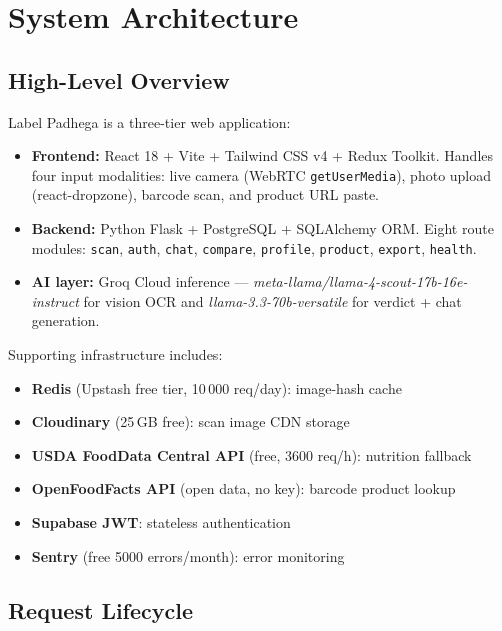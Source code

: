 \documentclass[conference]{IEEEtran}
\begin{document}
\section{System Architecture}

\subsection{High-Level Overview}

Label Padhega is a three-tier web application:
\begin{itemize}
  \item \textbf{Frontend:} React 18 + Vite + Tailwind CSS v4 + Redux Toolkit.
        Handles four input modalities: live camera (WebRTC \texttt{getUserMedia}),
        photo upload (react-dropzone), barcode scan, and product URL paste.
  \item \textbf{Backend:} Python Flask + PostgreSQL + SQLAlchemy ORM.
        Eight route modules: \texttt{scan}, \texttt{auth}, \texttt{chat},
        \texttt{compare}, \texttt{profile}, \texttt{product}, \texttt{export},
        \texttt{health}.
  \item \textbf{AI layer:} Groq Cloud inference ---
        \textit{meta-llama/llama-4-scout-17b-16e-instruct} for vision OCR
        and \textit{llama-3.3-70b-versatile} for verdict + chat generation.
\end{itemize}

\noindent Supporting infrastructure includes:
\begin{itemize}
  \item \textbf{Redis} (Upstash free tier, 10\,000 req/day): image-hash cache
  \item \textbf{Cloudinary} (25\,GB free): scan image CDN storage
  \item \textbf{USDA FoodData Central API} (free, 3600 req/h): nutrition fallback
  \item \textbf{OpenFoodFacts API} (open data, no key): barcode product lookup
  \item \textbf{Supabase JWT}: stateless authentication
  \item \textbf{Sentry} (free 5000 errors/month): error monitoring
\end{itemize}

\subsection{Request Lifecycle}
\end{document}
